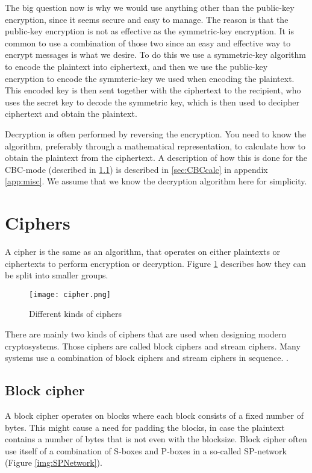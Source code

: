 The big question now is why we would use anything other than the public-key
encryption, since it seems secure and easy to manage. The reason is that the 
public-key encryption is not as effective as the symmetric-key encryption. 
It is common to use a combination of those two since an easy and effective way 
to encrypt messages is what we desire. To do this we use a symmetric-key 
algorithm to encode the plaintext into ciphertext, and then we use the 
public-key encryption to encode the symmteric-key we used when encoding the 
plaintext. This encoded key is then sent together with the ciphertext to the 
recipient, who uses the secret key to decode the symmetric key, which is then used to decipher ciphertext and obtain the plaintext.

Decryption is often performed by reversing the encryption. You need to know the 
algorithm, preferably through a mathematical representation, to calculate how 
to obtain the plaintext from the ciphertext. A description of how this is done 
for the CBC-mode (described in \ref{sec:BlockCipher}) is described in 
\ref{sec:CBCcalc} in appendix \ref{app:misc}. We assume that we know the 
decryption algorithm here for simplicity. 

\section{Ciphers}
A cipher is the same as an algorithm, that operates on either plaintexts or 
ciphertexts to perform encryption or decryption. Figure \ref{img:ciphers} 
describes how they can be split into smaller groups.

 \begin{figure}
   \texttt{[image: cipher.png]}
   \caption{Different kinds of ciphers \citep{CipherTax:2013}}
   \label{img:ciphers}
 \end{figure}

There are mainly two kinds of ciphers that are used when designing modern 
cryptosystems. Those ciphers are called block ciphers and stream ciphers. 
Many systems use a combination of block ciphers and stream ciphers in sequence.
.


\subsection{Block cipher}\label{sec:BlockCipher}
A block cipher operates on blocks where each block consists of a fixed number 
of bytes. This might cause a need for padding the blocks, in case the plaintext 
contains a number of bytes that is not even with the blocksize. Block cipher 
often use itself of a combination of S-boxes and P-boxes in a so-called 
SP-network (Figure \ref{img:SPNetwork}).


